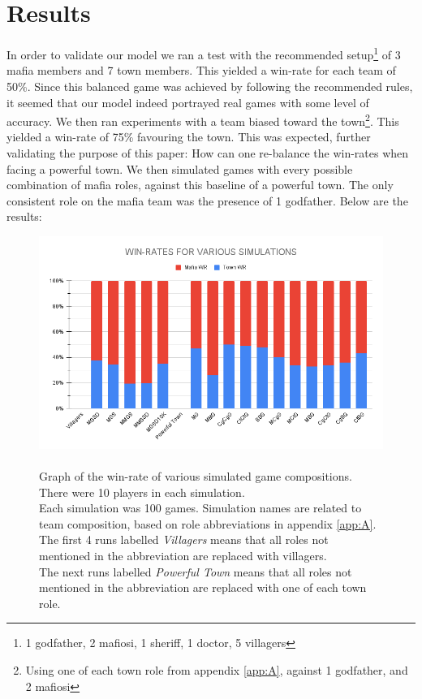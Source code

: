 \section{Results}\label{sec:results}
In order to validate our model we ran a test with the recommended
setup\footnote[1]{1 godfather, 2 mafiosi, 1 sheriff, 1 doctor, 5 villagers} of
3 mafia members and 7 town members\cite{MafiaRules}. This yielded a win-rate
for each team of 50\%. Since this balanced game was achieved by following the
recommended rules, it seemed that our model indeed portrayed real games with
some level of accuracy. We then ran experiments with a team biased toward the
town\footnote{Using one of each town role from appendix \ref{app:A}, against 1
    godfather, and 2 mafiosi}. This yielded a win-rate of 75\% favouring the town.
This was expected, further validating the purpose of this paper: How can one
re-balance the win-rates when facing a powerful town. We then simulated games
with every possible combination of mafia roles, against this baseline of a
powerful town. The only consistent role on the mafia team was the presence of 1
godfather. Below are the results:
\begin{figure}[H]
    \includegraphics[width=1\linewidth]{figures/Winrates}
    \caption{\\Graph of the win-rate of various simulated game compositions.\\
        There were 10 players in each simulation.\\
        Each simulation was 100 games.
        Simulation names are related to team composition, based on role
        abbreviations in appendix \ref{app:A}.\\
        The first 4 runs labelled \textit{Villagers} means that all roles not
        mentioned in the abbreviation are replaced with villagers.\\
        The next runs labelled \textit{Powerful Town} means that all roles not
        mentioned in the abbreviation are replaced with	one of each town role.}
    \label{fig:VariousSimulations}
\end{figure}
